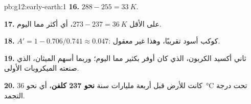 \begin{solution}{pb:g12:early-earth:1}
\textbf{16.} $288 - 255 = \qty{33}{K}$.

\textbf{17.} على الأقل $273 - 237 = \qty{36}{K}$، أي أكثر مما اليوم.

\textbf{18.} $A' = 1 - 0.706/0.741 \approx 0.047$: كوكب أسود تقريبًا،
وهذا غير معقول.

\textbf{19.} ثاني أكسيد الكربون، الذي كان أوفر بكثير مما اليوم؛ وربما أسهم الميثان،
الذي صنعته الميكروبات الأولى.

\textbf{20.} كانت  للأرض قبل أربعة مليارات سنة
\textbf{نحو 237 كلفن}، أي نحو \qty{36}{\celsius} تحت درجة التجمد.
\end{solution}
